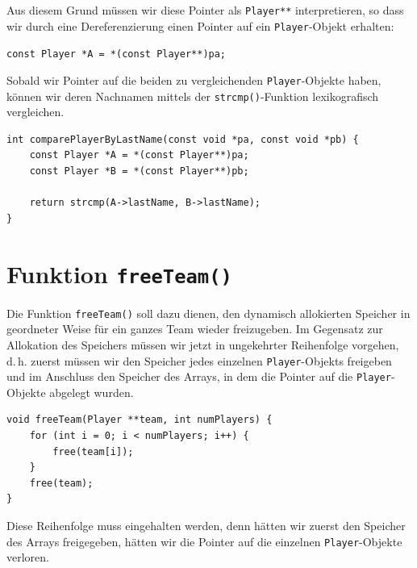 Aus diesem Grund müssen wir diese Pointer als \texttt{Player**}
interpretieren, so dass wir durch eine Dereferenzierung einen Pointer auf ein
\texttt{Player}-Objekt erhalten:

\noindent\texttt{const Player *A = *(const Player**)pa;}

Sobald wir Pointer auf die beiden zu vergleichenden
\texttt{Player}-Objekte haben, können wir deren Nachnamen mittels der
\texttt{strcmp()}-Funktion lexikografisch vergleichen.

\begin{verbatim}
int comparePlayerByLastName(const void *pa, const void *pb) {
    const Player *A = *(const Player**)pa;
    const Player *B = *(const Player**)pb;

    return strcmp(A->lastName, B->lastName);
}
\end{verbatim}

\section*{Funktion \texttt{freeTeam()}}

Die Funktion \texttt{freeTeam()} soll dazu dienen, den dynamisch
allokierten Speicher in geordneter Weise für ein ganzes Team wieder freizugeben.
Im Gegensatz zur Allokation des Speichers müssen wir jetzt in ungekehrter
Reihenfolge vorgehen, d.\,h. zuerst müssen wir den Speicher jedes einzelnen
\texttt{Player}-Objekts freigeben und im Anschluss den Speicher des
Arrays, in dem die Pointer auf die \texttt{Player}-Objekte abgelegt
wurden.

\begin{verbatim}
void freeTeam(Player **team, int numPlayers) {
    for (int i = 0; i < numPlayers; i++) {
        free(team[i]);
    }
    free(team);
}
\end{verbatim}

Diese Reihenfolge muss eingehalten werden, denn hätten wir zuerst den Speicher
des Arrays freigegeben, hätten wir die Pointer auf die einzelnen
\texttt{Player}-Objekte verloren.
